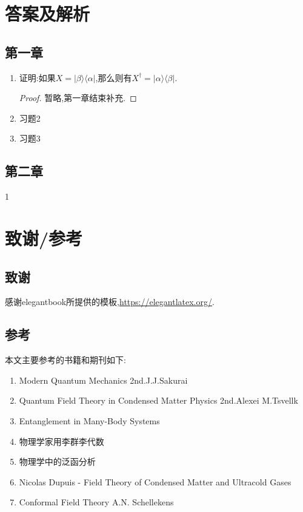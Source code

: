 \documentclass[lang=cn,newtx,10pt,scheme=chinese,thmcnt=section]{elegantbook}
\begin{document}
\chapter{答案及解析}
\section{第一章}
\begin{enumerate}
	\item 证明:如果$X=|\beta\rangle\langle\alpha|$,那么则有$X^\dagger=|\alpha\rangle\langle\beta|$.
	\begin{proof}
		暂略,第一章结束补充.
	\end{proof}
	\item 习题2
	\item 习题3
\end{enumerate}
\section{第二章}
1
\chapter{致谢/参考}
\section{致谢}
感谢elegantbook所提供的模板,\href{https://elegantlatex.org/}{https://elegantlatex.org/}.\\

\section{参考}
本文主要参考的书籍和期刊如下:
\begin{enumerate}
	\item Modern Quantum Mechanics 2nd.J.J.Sakurai
	\item Quantum Field Theory in Condensed Matter Physics 2nd.Alexei M.Tsvellk
	\item Entanglement in Many-Body Systems
	\item 物理学家用李群李代数
	\item 物理学中的泛函分析
	\item Nicolas Dupuis - Field Theory of Condensed Matter and Ultracold Gases
	\item Conformal Field Theory A.N. Schellekens
\end{enumerate}
\end{document}
